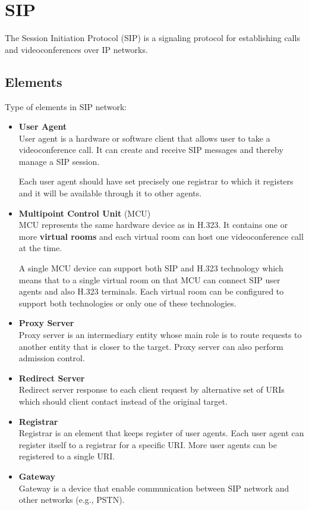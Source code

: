 \documentclass[a4paper]{report}
\begin{document}
\section{SIP}

The Session Initiation Protocol (SIP) is a signaling protocol for establishing calls and videoconferences over IP networks.

\subsection{Elements}

Type of elements in SIP network:

\begin{itemize}
\item \textbf{User Agent} \\
User agent is a hardware or software client that allows user to take a 
videoconference call. It can create and receive SIP messages and thereby
manage a SIP session.

Each user agent should have set precisely one registrar to which it registers and it will be available through it to other agents.

\item \textbf{Multipoint Control Unit} (MCU) \\
MCU represents the same hardware device as in H.323. It contains one or more \textbf{virtual rooms} and each virtual room can host one videoconference call at the time.

A single MCU device can support both SIP and H.323 technology which means that to a single virtual room on that MCU can connect SIP user agents and also H.323 terminals. Each virtual room can be configured to support both technologies or only one of these technologies.

\item \textbf{Proxy Server} \\
Proxy server is an intermediary entity whose main role is to route requests to another entity that is closer to the target. Proxy server can also perform admission control.

\item \textbf{Redirect Server} \\
Redirect server response to each client request by alternative set of URIs which should client contact instead of the original target.

\item \textbf{Registrar} \\
Registrar is an element that keeps register of user agents. Each user agent can register itself to a registrar for a specific URI. More user agents can be registered to a single URI. 

\item \textbf{Gateway} \\
Gateway is a device that enable communication between SIP network and other networks (e.g., PSTN).
\end{itemize}
\end{document}
